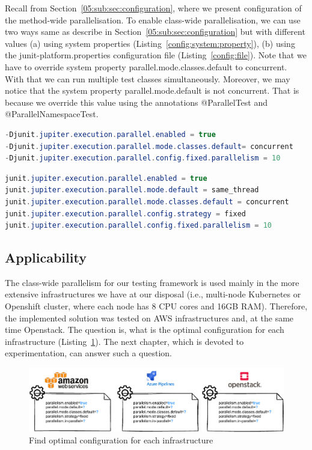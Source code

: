 Recall from Section~\ref{05:sub:sec:configuration}, where we present configuration of the method-wide parallelisation.
To enable class-wide parallelisation, we can use two ways same as describe in Section~\ref{05:sub:sec:configuration} but
with different values (a) using system properties (Listing~\ref{config:system:property}),
(b) using the junit-platform.properties configuration file (Listing~\ref{config:file}).
Note that we have to override system property parallel.mode.classes.default to concurrent.
With that we can run multiple test classes simultaneously.
Moreover, we may notice that the system property parallel.mode.default is not concurrent.
That is because we override this value using the annotations @ParallelTest and @ParallelNamespaceTest.
\begin{lstlisting}[language= Java,label=config:system:property,caption=(a) Configuration via system properties,frame=tb]
-Djunit.jupiter.execution.parallel.enabled = true
-Djunit.jupiter.execution.parallel.mode.classes.default= concurrent
-Djunit.jupiter.execution.parallel.config.fixed.parallelism = 10
\end{lstlisting}
\begin{lstlisting}[language=Java,label=config:file,caption=(b) Configuration via file,frame = tb]
junit.jupiter.execution.parallel.enabled = true
junit.jupiter.execution.parallel.mode.default = same_thread
junit.jupiter.execution.parallel.mode.classes.default = concurrent
junit.jupiter.execution.parallel.config.strategy = fixed
junit.jupiter.execution.parallel.config.fixed.parallelism = 10
\end{lstlisting}

\subsection{Applicability}
\label{05:class:wide:application}

The class-wide parallelism for our testing framework is used mainly in the more extensive infrastructures we have at our disposal
(i.e., multi-node Kubernetes or Openshift cluster, where each node has 8 CPU cores and 16GB RAM).
Therefore, the implemented solution was tested on AWS infrastructures and, at the same time Openstack.
The question is, what is the optimal configuration for each infrastructure (Listing~\ref{07:fig:optimal:configuration:infrastructure}).
The next chapter, which is devoted to experimentation, can answer such a question.

\begin{figure}[!ht]
\centering
\includegraphics[scale=0.9]{obrazky-figures/07-implementation/01-configuration}
\caption{Find optimal configuration for each infrastructure}
\label{07:fig:optimal:configuration:infrastructure}
\end{figure}

